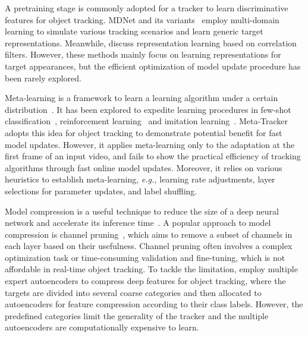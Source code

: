 \documentclass[letterpaper]{article} %
\begin{document}
A pretraining stage is commonly adopted for a tracker to learn discriminative features for object tracking.
MDNet and its variants~\cite{nam2016learningmulti,jung2018realtime} employ multi-domain learning to simulate various tracking scenarios and learn generic target representations.
Meanwhile, \cite{luca2016fullycovolutional,jack2017endtoend,zheng2018distractor} discuss representation learning based on correlation filters.
However, these methods mainly focus on learning representations for target appearances, but the efficient optimization of model update procedure has been rarely explored.

Meta-learning is a framework to learn a learning algorithm under a certain distribution~\cite{thrun1998learning,hochreiter2001learning}.
It has been explored to expedite learning procedures in few-shot classification~\cite{santoro2016meta,andrychowicz2016learning,finn2017model_agnostic,li2017metaSGD}, reinforcement learning~\cite{finn2017model_agnostic,al2018continuous} and imitation learning~\cite{duan2017one}.
Meta-Tracker~\cite{park2018metatracker} adopts this idea for object tracking to demonstrate potential benefit for fast model updates.
However, it applies meta-learning only to the adaptation at the first frame of an input video, and fails to show the practical efficiency of tracking algorithms through fast online model updates.
Moreover, it relies on various heuristics to establish meta-learning, {\it e.g.,} learning rate adjustments, layer selections for parameter updates, and label shuffling.

Model compression is a useful technique to reduce the size of a deep neural network and accelerate its inference time~\cite{han2015learningboth,han16deep}.
A popular approach to model compression is channel pruning~\cite{wen2016learningsparsity,he2017channel}, which aims to remove a subset of channels in each layer based on their usefulness.
Channel pruning often involves a complex optimization task or time-consuming validation and fine-tuning, which is not affordable in real-time object tracking.
To tackle the limitation, \cite{choi2018context} employ multiple expert autoencoders to compress deep features for object tracking, where the targets are divided into several coarse categories and then allocated to autoencoders for feature compression according to their class labels.
However, the predefined categories limit the generality of the tracker and the multiple autoencoders are computationally expensive to learn.
\end{document}
